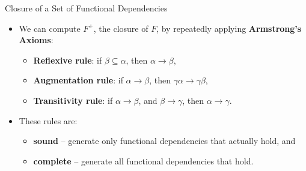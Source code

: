 \documentclass[aspectratio=169]{beamer}
\begin{document}
\begin{frame}{Closure of a Set of Functional Dependencies}
    \begin{itemize}
        \item We can compute $F^+$, the closure of $F$, by repeatedly applying \textbf{Armstrong's Axioms}:
            \begin{itemize}
                \item \textbf{Reflexive rule}: if $\beta \subseteq \alpha$, then $\alpha \rightarrow \beta$,
                \item \textbf{Augmentation rule}: if $\alpha \rightarrow \beta$, then $\gamma \alpha \rightarrow \gamma \beta$,
                \item \textbf{Transitivity rule}: if $\alpha \rightarrow \beta$, and $\beta \rightarrow \gamma$, then $\alpha \rightarrow \gamma$.
            \end{itemize}
        \item These rules are:
            \begin{itemize}
                \item \textbf{sound} -- generate only functional dependencies that actually hold, and
                \item \textbf{complete} -- generate all functional dependencies that hold.
            \end{itemize}
    \end{itemize}
\end{frame}
\end{document}
